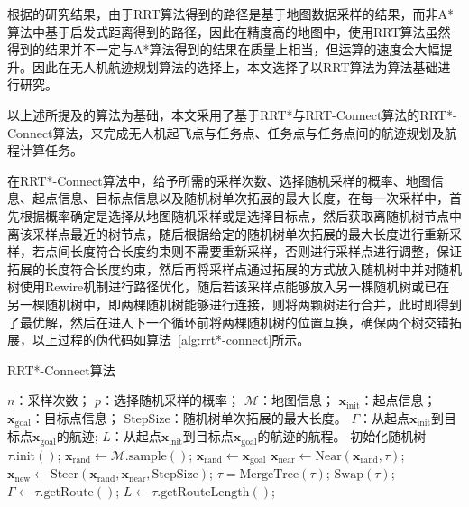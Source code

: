 根据\citet{braun2019ComparisonRRTAlgorithmsa}的研究结果，由于RRT算法得到的路径是基于地图数据采样的结果，而非A*算法中基于启发式距离得到的路径，因此在精度高的地图中，使用RRT算法虽然得到的结果并不一定与A*算法得到的结果在质量上相当，但运算的速度会大幅提升。因此在无人机航迹规划算法的选择上，本文选择了以RRT算法为算法基础进行研究。

以上述所提及的算法为基础，本文采用了基于RRT*与RRT-Connect算法的RRT*-Connect算法，来完成无人机起飞点与任务点、任务点与任务点间的航迹规划及航程计算任务。

在RRT*-Connect算法中，给予所需的采样次数、选择随机采样的概率、地图信息、起点信息、目标点信息以及随机树单次拓展的最大长度，在每一次采样中，首先根据概率确定是选择从地图随机采样或是选择目标点，然后获取离随机树节点中离该采样点最近的树节点，随后根据给定的随机树单次拓展的最大长度进行重新采样，若点间长度符合长度约束则不需要重新采样，否则进行采样点进行调整，保证拓展的长度符合长度约束，然后再将采样点通过拓展的方式放入随机树中并对随机树使用Rewire机制进行路径优化，随后若该采样点能够放入另一棵随机树或已在另一棵随机树中，即两棵随机树能够进行连接，则将两颗树进行合并，此时即得到了最优解，然后在进入下一个循环前将两棵随机树的位置互换，确保两个树交错拓展，以上过程的伪代码如算法~\ref{alg:rrt*-connect}所示。

\begin{algorithm}[!htbp]
  \caption{RRT*-Connect算法} %
  \label{alg:rrt*-connect}
  \begin{algorithmic}[1]
    \REQUIRE 
        \( n \)：采样次数；
        \( p \)：选择随机采样的概率；
        \( \mathcal{M} \)：地图信息；
        \( \boldsymbol{x}_{\textrm{init}} \)：起点信息；
        \( \boldsymbol{x}_{\textrm{goal}} \)：目标点信息；
        \( \textrm{StepSize} \)：随机树单次拓展的最大长度。
    \ENSURE 
        \( \Gamma \)：从起点\( \boldsymbol{x}_{\textrm{init}} \)到目标点\( \boldsymbol{x}_{\textrm{goal}} \)的航迹;
        \( L \)：从起点\( \boldsymbol{x}_{\textrm{init}} \)到目标点\( \boldsymbol{x}_{\textrm{goal}} \)的航迹的航程。
    \STATE 初始化随机树 \( \tau.\textrm{init}() \);
            \STATE \( \boldsymbol{x}_{\textrm{rand}} \gets \mathcal{M}.\textrm{sample}() \);
        \ELSE
            \STATE \( \boldsymbol{x}_{\textrm{rand}} \gets \boldsymbol{x}_{\textrm{goal}} \)
        \ENDIF
        \STATE \( \boldsymbol{x}_{\textrm{near}} \gets \textrm{Near}(\boldsymbol{x}_{\textrm{rand}}, \tau) \);
        \STATE \( \boldsymbol{x}_{\textrm{new}} \gets \textrm{Steer}(\boldsymbol{x}_{\textrm{rand}}, \boldsymbol{x}_{\textrm{near}}, \textrm{StepSize}) \);
                \STATE \( \tau = \textrm{MergeTree}(\tau) \);
            \ENDIF
        \ENDIF
        \STATE \( \textrm{Swap}(\tau) \);
    \ENDFOR
    \STATE \( \Gamma \gets \tau.\textrm{getRoute}() \);
    \STATE \( L \gets \tau.\textrm{getRouteLength}() \);
  \end{algorithmic}
\end{algorithm}

